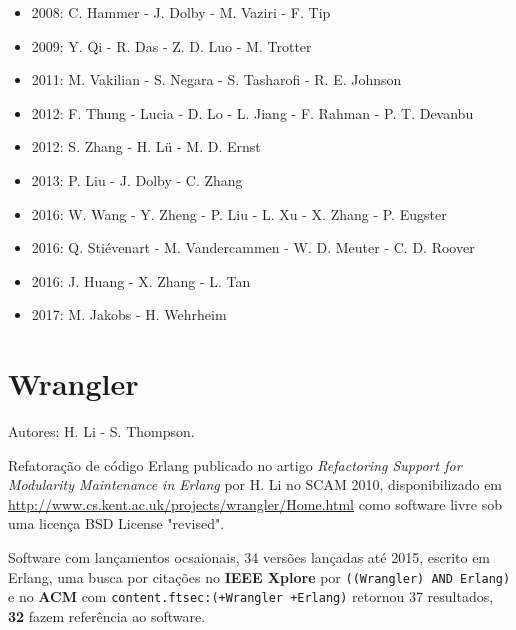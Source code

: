 \begin{itemize}
\item 2008: C. Hammer - J. Dolby - M. Vaziri - F. Tip
\item 2009: Y. Qi - R. Das - Z. D. Luo - M. Trotter
\item 2011: M. Vakilian - S. Negara - S. Tasharofi - R. E. Johnson
\item 2012: F. Thung - Lucia - D. Lo - L. Jiang - F. Rahman - P. T. Devanbu
\item 2012: S. Zhang - H. L\"{u} - M. D. Ernst
\item 2013: P. Liu - J. Dolby - C. Zhang
\item 2016: W. Wang - Y. Zheng - P. Liu - L. Xu - X. Zhang - P. Eugster
\item 2016: Q. Stiévenart - M. Vandercammen - W. D. Meuter - C. D. Roover
\item 2016: J. Huang - X. Zhang - L. Tan
\item 2017: M. Jakobs - H. Wehrheim
\end{itemize}

\section{Wrangler}

Autores:
H. Li - S. Thompson.

Refatoração de código Erlang
publicado no artigo {\it Refactoring Support for Modularity Maintenance in Erlang}
por H. Li
no SCAM 2010,
disponibilizado em \url{http://www.cs.kent.ac.uk/projects/wrangler/Home.html}
como software livre
sob uma licença BSD License "revised".

Software com lançamentos ocsaionais,
34 versões lançadas
até 2015,
escrito em Erlang,
uma busca por citações no {\bf IEEE Xplore} por
\texttt{((Wrangler) AND Erlang)}
e no {\bf ACM} com
\texttt{content.ftsec:(+Wrangler +Erlang)}
retornou
37 resultados,
{\bf 32} fazem referência ao software.

